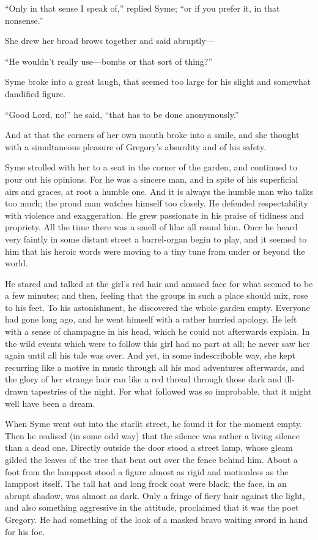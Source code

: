 “Only in that sense I speak of,” replied Syme; “or if you prefer it, in that nonsense.”

She drew her broad brows together and said abruptly⁠—

“He wouldn’t really use⁠—bombs or that sort of thing?”

Syme broke into a great laugh, that seemed too large for his slight and somewhat dandified figure.

“Good Lord, no!” he said, “that has to be done anonymously.”

And at that the corners of her own mouth broke into a smile, and she thought with a simultaneous pleasure of Gregory’s absurdity and of his safety.

Syme strolled with her to a seat in the corner of the garden, and continued to pour out his opinions. For he was a sincere man, and in spite of his superficial airs and graces, at root a humble one. And it is always the humble man who talks too much; the proud man watches himself too closely. He defended respectability with violence and exaggeration. He grew passionate in his praise of tidiness and propriety. All the time there was a smell of lilac all round him. Once he heard very faintly in some distant street a barrel-organ begin to play, and it seemed to him that his heroic words were moving to a tiny tune from under or beyond the world.

He stared and talked at the girl’s red hair and amused face for what seemed to be a few minutes; and then, feeling that the groups in such a place should mix, rose to his feet. To his astonishment, he discovered the whole garden empty. Everyone had gone long ago, and he went himself with a rather hurried apology. He left with a sense of champagne in his head, which he could not afterwards explain. In the wild events which were to follow this girl had no part at all; he never saw her again until all his tale was over. And yet, in some indescribable way, she kept recurring like a motive in music through all his mad adventures afterwards, and the glory of her strange hair ran like a red thread through those dark and ill-drawn tapestries of the night. For what followed was so improbable, that it might well have been a dream.

When Syme went out into the starlit street, he found it for the moment empty. Then he realised (in some odd way) that the silence was rather a living silence than a dead one. Directly outside the door stood a street lamp, whose gleam gilded the leaves of the tree that bent out over the fence behind him. About a foot from the lamppost stood a figure almost as rigid and motionless as the lamppost itself. The tall hat and long frock coat were black; the face, in an abrupt shadow, was almost as dark. Only a fringe of fiery hair against the light, and also something aggressive in the attitude, proclaimed that it was the poet Gregory. He had something of the look of a masked bravo waiting sword in hand for his foe.

